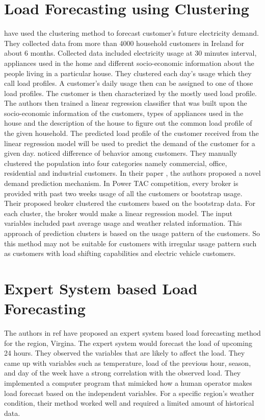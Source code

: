 \section {Load Forecasting using Clustering}
\cite{mcloughlin2015clustering} have used the clustering method to forecast customer's future electricity demand. They collected data from more than 4000 household customers in Ireland for about 6 months. Collected data included electricity usage at 30 minutes interval, appliances used in the home and different socio-economic information about the people living in a particular house. They clustered each day's usage which they call load profiles. A customer's daily usage then can be assigned to one of those load profiles. The customer is then characterized by the mostly used load profile. The authors then trained a linear regression classifier that was built upon the socio-economic information of the customers, types of appliances used in the house and the description of the house to figure out the common load profile of the given household. The predicted load profile of the customer received from the linear regression model will be used to predict the demand of the customer for a given day. \cite{cho1995customer} noticed difference of behavior among customers. They manually clustered the population into four categories namely commercial, office, residential and industrial customers. In their paper \cite{wang2015gongbroker}, the authors proposed a novel demand prediction mechanism. In Power TAC competition, every broker is provided with past two weeks usage of all the customers or bootstrap usage. Their proposed broker clustered the customers based on the bootstrap data. For each cluster, the broker would make a linear regression model. The input variables included past average usage and weather related information. This approach of prediction clusters is based on the usage pattern of the customers. So this method may not be suitable for customers with irregular usage pattern such as customers with load shifting capabilities and electric vehicle customers. 

\section{Expert System based Load Forecasting}
The authors in ref \cite{rahman1988expert} have proposed an expert system based load forecasting method for the region, Virgina. The expert system would forecast the load of upcoming 24 hours. They observed the variables that are likely to affect the load. They came up with variables such as temperature, load of the previous hour, season, and day of the week have a strong correlation with the observed load. They implemented a computer program that mimicked how a human operator makes load forecast based on the independent variables. For a specific region's weather condition, their method worked well and required a limited amount of historical data. 


